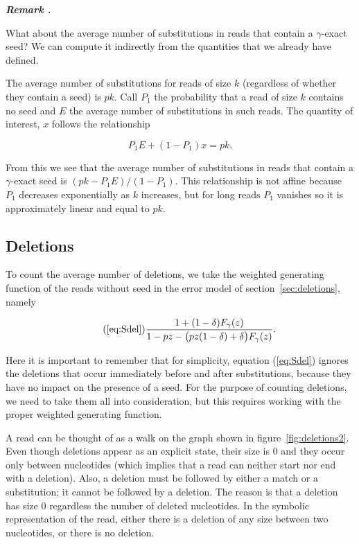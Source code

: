 \documentclass{article}
\newcounter{remarkcounter}
\newenvironment{remark}
{\small\it\vspace{0.5\baselineskip}
  \refstepcounter{remarkcounter}%
  \noindent\textbf{Remark \arabic{remarkcounter}.}%
}{\vspace{0.5\baselineskip}}
\begin{document}
\begin{remark}
What about the average number of substitutions in reads that contain a
$\gamma$-exact seed? We can compute it indirectly from the quantities that
we already have defined.

The average number of substitutions for reads of size $k$ (regardless of
whether they contain a seed) is $pk$. Call $P_1$ the probability that a
read of size $k$ contains no seed and $E$ the average number of
substitutions in such reads. The quantity of interest, $x$ follows the
relationship

\begin{equation*}
P_1E + (1-P_1)x = pk.
\end{equation*}

From this we see that the average number of substitutions in reads that
contain a $\gamma$-exact seed is $(pk - P_1E) / (1-P_1)$. This
relationship is not affine because $P_1$ decreases exponentially as $k$
increases, but for long reads $P_1$ vanishes so it is approximately
linear and equal to $pk$.
\end{remark}



\subsection{Deletions}
\label{sec:avdel}

To count the average number of deletions, we take the weighted generating
function of the reads without seed in the error model of
section~\ref{sec:deletions}, namely

\begin{equation}
\tag{\ref{eq:Sdel}}
\frac{1+(1-\delta)F_\gamma(z)}
  {1-pz - \big(pz(1-\delta) + \delta\big)F_\gamma(z)}.
\end{equation}

Here it is important to remember that for simplicity, equation
(\ref{eq:Sdel}) ignores the deletions that occur immediately before and
after substitutions, because they have no impact on the presence of a
seed. For the purpose of counting deletions, we need to take them all into
consideration, but this requires working with the proper weighted
generating function.

A read can be thought of as a walk on the graph shown in
figure~\ref{fig:deletions2}. Even though deletions appear as an explicit
state, their size is $0$ and they occur only between nucleotides (which
implies that a read can neither start nor end with a deletion). Also, a
deletion must be followed by either a match or a substitution; it cannot
be followed by a deletion. The reason is that a deletion has size $0$
regardless the number of deleted nucleotides. In the symbolic
representation of the read, either there is a deletion of any size between
two nucleotides, or there is no deletion.
\end{document}
